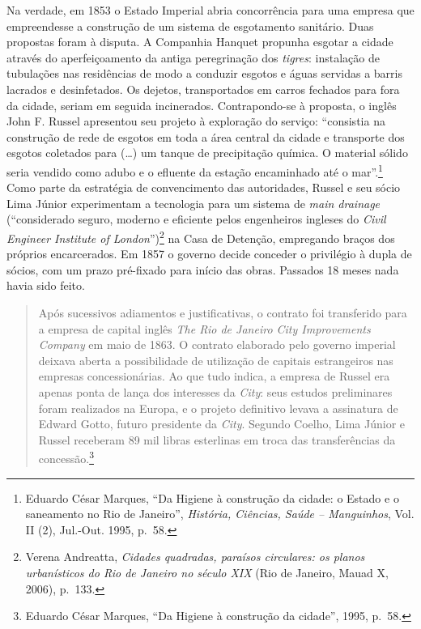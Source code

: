 Na verdade, em 1853 o Estado Imperial abria concorrência para uma
empresa que empreendesse a construção de um sistema de esgotamento
sanitário. Duas propostas foram à disputa. A Companhia Hanquet propunha
esgotar a cidade através do aperfeiçoamento da antiga peregrinação dos
\emph{tigres}: instalação de tubulações nas residências de modo a
conduzir esgotos e águas servidas a barris lacrados e desinfetados. Os
dejetos, transportados em carros fechados para fora da cidade, seriam em
seguida incinerados. Contrapondo-se à proposta, o inglês John F. Russel
apresentou seu projeto à exploração do serviço: ``consistia na
construção de rede de esgotos em toda a área central da cidade e
transporte dos esgotos coletados para (\ldots{}) um tanque de
precipitação química. O material sólido seria vendido como adubo e o
efluente da estação encaminhado até o mar''.\footnote{Eduardo César
  Marques, ``Da Higiene à construção da cidade: o Estado e o saneamento
  no Rio de Janeiro'', \emph{História, Ciências, Saúde -- Manguinhos},
  Vol. II (2), Jul.-Out. 1995, p.~58.} Como parte da estratégia de
convencimento das autoridades, Russel e seu sócio Lima Júnior
experimentam a tecnologia para um sistema de \emph{main drainage}
(``considerado seguro, moderno e eficiente pelos engenheiros ingleses do
\emph{Civil Engineer Institute of London}'')\footnote{Verena Andreatta,
  \emph{Cidades quadradas, paraísos circulares: os planos urbanísticos
  do Rio de Janeiro no século XIX} (Rio de Janeiro, Mauad X, 2006),
  p.~133.} na Casa de Detenção, empregando braços dos próprios
encarcerados. Em 1857 o governo decide conceder o privilégio à dupla de
sócios, com um prazo pré-fixado para início das obras. Passados 18 meses
nada havia sido feito.

\begin{quote}
Após sucessivos adiamentos e justificativas, o contrato foi transferido
para a empresa de capital inglês \emph{The Rio de Janeiro City
Improvements Company} em maio de 1863. O contrato elaborado pelo governo
imperial deixava aberta a possibilidade de utilização de capitais
estrangeiros nas empresas concessionárias. Ao que tudo indica, a empresa
de Russel era apenas ponta de lança dos interesses da \emph{City}: seus
estudos preliminares foram realizados na Europa, e o projeto definitivo
levava a assinatura de Edward Gotto, futuro presidente da \emph{City}.
Segundo Coelho, Lima Júnior e Russel receberam 89 mil libras esterlinas
em troca das transferências da concessão.\footnote{Eduardo César
  Marques, ``Da Higiene à construção da cidade'', 1995, p.~58.}
\end{quote}

